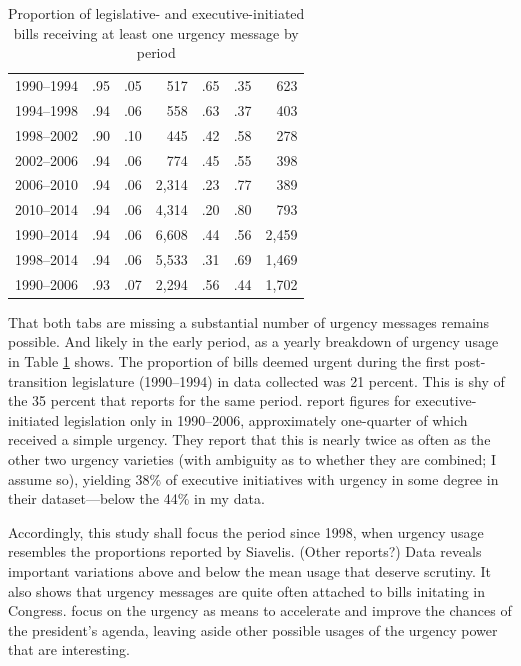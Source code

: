 \documentclass[letter,12pt]{article}
\begin{document}
\begin{table}
\begin{center}
\begin{tabular}{crrr|rrr}
1990--1994  &.95  & .05 & 517  &.65  &.35 & 623 \\
1994--1998  &.94  & .06 & 558  &.63  &.37 & 403 \\
1998--2002  &.90  & .10 & 445  &.42  &.58 & 278 \\
2002--2006  &.94  & .06 & 774  &.45  &.55 & 398 \\
2006--2010  &.94  & .06 &2,314 &.23  &.77 & 389 \\
2010--2014  &.94  & .06 &4,314 &.20  &.80 & 793 \\ \hline \hline
1990--2014  & .94 & .06 & 6,608 & .44 & .56 & 2,459 \\ 
1998--2014  & .94 & .06 & 5,533 & .31 & .69 & 1,469 \\ 
1990--2006  & .93 & .07 & 2,294 & .56 & .44 & 1,702 \\ 
\end{tabular}
\caption{Proportion of legislative- and executive-initiated bills receiving at least one urgency message by period}\label{t:yearProp}
\end{center}
\end{table}

That both tabs are missing a substantial number of urgency messages remains possible. And likely in the early period, as a yearly breakdown of urgency usage in Table \ref{t:yearProp} shows. The proportion of bills deemed urgent during the first post-transition legislature (1990--1994) in data collected was 21 percent. This is shy of the 35 percent that \citet{siavelis.2002} reports for the same period. \citet[][:404]{aleman.navia.UrgChi.2009} report figures for executive-initiated legislation only in 1990--2006, approximately one-quarter of which received a simple urgency. They report that this is nearly twice as often as the other two urgency varieties (with ambiguity as to whether they are combined; I assume so), yielding 38\% of executive initiatives with urgency in some degree in their dataset---below the 44\% in my data. 

Accordingly, this study shall focus the period since 1998, when urgency usage resembles the proportions reported by Siavelis. (Other reports?) Data reveals important variations above and below the mean usage that deserve scrutiny. It also shows that urgency messages are quite often attached to bills initating in Congress. \citet{aleman.navia.UrgChi.2009} focus on the urgency as means to accelerate and improve the chances of the president's agenda, leaving aside other possible usages of the urgency power that are interesting. 
\end{document}
